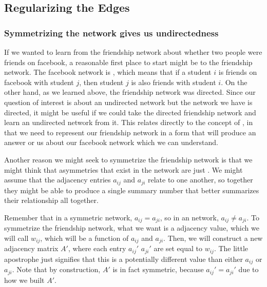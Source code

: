 \documentclass[letterpaper,10pt,english]{jupyterBook}
\begin{document}
\subsection{Regularizing the Edges}
\label{\detokenize{representations/ch4/regularization:regularizing-the-edges}}

\subsubsection{Symmetrizing the network gives us undirectedness}
\label{\detokenize{representations/ch4/regularization:symmetrizing-the-network-gives-us-undirectedness}}
\sphinxAtStartPar
If we wanted to learn from the friendship network about whether two people were friends on facebook, a reasonable first place to start might be to  the friendship network. The facebook network is , which means that if a student \(i\) is friends on facebook with student \(j\), then student \(j\) is also friends with student \(i\). On the other hand, as we learned above, the friendship network was directed. Since our question of interest is about an undirected network but the network we have is directed, it might be useful if we could take the directed friendship network and learn an undirected network from it. This relates directly to the concept of , in that we need to represent our friendship network in a form that will produce an answer or us about our facebook network which we can understand.

\sphinxAtStartPar
Another reason we might seek to symmetrize the friendship network is that we might think that asymmetries that exist in the network are just . We might assume that the adjacency entries \(a_{ij}\) and \(a_{ji}\) relate to one another, so together they might be able to produce a single summary number that better summarizes their relationship all together.

\sphinxAtStartPar
Remember that in a symmetric network, \(a_{ij} = a_{ji}\), so in an  network, \(a_{ij} \neq a_{ji}\). To symmetrize the friendship network, what we want is a  adjacency value, which we will call \(w_{ij}\), which will be a function of \(a_{ij}\) and \(a_{ji}\). Then, we will construct a new adjacency matrix \(A'\), where each entry \(a_{ij}'\)  \(a_{ji}'\) are set equal to \(w_{ij}\).  The little apostrophe just signifies that this is a potentially different value than either \(a_{ij}\) or \(a_{ji}\). Note that by construction, \(A'\) is in fact symmetric, because \(a_{ij}' = a_{ji}'\) due to how we built \(A'\).
\end{document}
